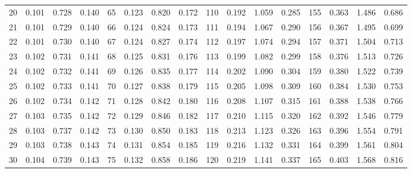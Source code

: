 \begin{table}[!h]
{\begin{tabular}{rrrr|rrrr|rrrr|crrr}
 20 & \tiny{  0.101} &   0.728 & \tiny{  0.140} &  65 & \tiny{  0.123} &   0.820 & \tiny{  0.172} & 110 & \tiny{  0.192} &   1.059 & \tiny{  0.285} & 155 & \tiny{  0.363} &   1.486 & \tiny{  0.686}\\
 21 & \tiny{  0.101} &   0.729 & \tiny{  0.140} &  66 & \tiny{  0.124} &   0.824 & \tiny{  0.173} & 111 & \tiny{  0.194} &   1.067 & \tiny{  0.290} & 156 & \tiny{  0.367} &   1.495 & \tiny{  0.699}\\
 22 & \tiny{  0.101} &   0.730 & \tiny{  0.140} &  67 & \tiny{  0.124} &   0.827 & \tiny{  0.174} & 112 & \tiny{  0.197} &   1.074 & \tiny{  0.294} & 157 & \tiny{  0.371} &   1.504 & \tiny{  0.713}\\
 23 & \tiny{  0.102} &   0.731 & \tiny{  0.141} &  68 & \tiny{  0.125} &   0.831 & \tiny{  0.176} & 113 & \tiny{  0.199} &   1.082 & \tiny{  0.299} & 158 & \tiny{  0.376} &   1.513 & \tiny{  0.726}\\
 24 & \tiny{  0.102} &   0.732 & \tiny{  0.141} &  69 & \tiny{  0.126} &   0.835 & \tiny{  0.177} & 114 & \tiny{  0.202} &   1.090 & \tiny{  0.304} & 159 & \tiny{  0.380} &   1.522 & \tiny{  0.739}\\
 25 & \tiny{  0.102} &   0.733 & \tiny{  0.141} &  70 & \tiny{  0.127} &   0.838 & \tiny{  0.179} & 115 & \tiny{  0.205} &   1.098 & \tiny{  0.309} & 160 & \tiny{  0.384} &   1.530 & \tiny{  0.753}\\
 26 & \tiny{  0.102} &   0.734 & \tiny{  0.142} &  71 & \tiny{  0.128} &   0.842 & \tiny{  0.180} & 116 & \tiny{  0.208} &   1.107 & \tiny{  0.315} & 161 & \tiny{  0.388} &   1.538 & \tiny{  0.766}\\
 27 & \tiny{  0.103} &   0.735 & \tiny{  0.142} &  72 & \tiny{  0.129} &   0.846 & \tiny{  0.182} & 117 & \tiny{  0.210} &   1.115 & \tiny{  0.320} & 162 & \tiny{  0.392} &   1.546 & \tiny{  0.779}\\
 28 & \tiny{  0.103} &   0.737 & \tiny{  0.142} &  73 & \tiny{  0.130} &   0.850 & \tiny{  0.183} & 118 & \tiny{  0.213} &   1.123 & \tiny{  0.326} & 163 & \tiny{  0.396} &   1.554 & \tiny{  0.791}\\
 29 & \tiny{  0.103} &   0.738 & \tiny{  0.143} &  74 & \tiny{  0.131} &   0.854 & \tiny{  0.185} & 119 & \tiny{  0.216} &   1.132 & \tiny{  0.331} & 164 & \tiny{  0.399} &   1.561 & \tiny{  0.804}\\
 30 & \tiny{  0.104} &   0.739 & \tiny{  0.143} &  75 & \tiny{  0.132} &   0.858 & \tiny{  0.186} & 120 & \tiny{  0.219} &   1.141 & \tiny{  0.337} & 165 & \tiny{  0.403} &   1.568 & \tiny{  0.816}\\

\end{tabular}}
\end{table}
